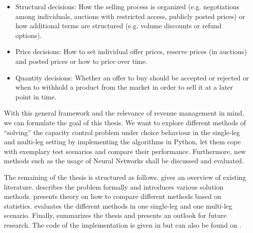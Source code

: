 \begin{itemize}
	\item Structural decisions: How the selling process is organized (e.g. negotiations among individuals, auctions with restricted access, publicly posted prices) or how additional terms are structured (e.g. volume discounts or refund options).
	\item Price decisions: How to set individual offer prices, reserve prices (in auctions) and posted prices or how to price over time.
	\item Quantity decisions: Whether an offer to buy should be accepted or rejected or when to withhold a product from the market in order to sell it at a later point in time.
\end{itemize}

With this general framework and the relevance of revenue management in mind, we can formulate the goal of this thesis. We want to explore different methods of \enquote{solving} the capacity control problem under choice behaviour in the single-leg and multi-leg setting by implementing the algorithms in Python, let them cope with exemplary test scenarios and compare their performance. Furthermore, new methods such as the usage of Neural Networks shall be discussed and evaluated. 

The remaining of the thesis is structured as follows. 
 gives an overview of existing literature.
 describes the problem formally and introduces various solution methods.
 presents theory on how to compare different methods based on statistics.
 evaluates the different methods in one single-leg and one multi-leg scenario.
Finally,  summarizes the thesis and presents an outlook for future research. The code of the implementation is given in  but can also be found on .